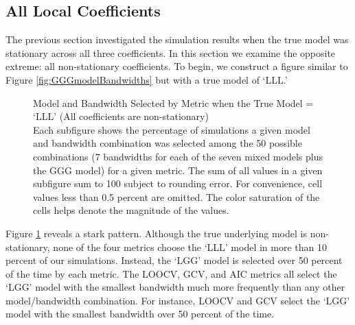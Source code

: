 \documentclass{article}\usepackage[]{graphicx}\usepackage[]{color}
\begin{document}
\subsection{All Local Coefficients}

The previous section investigated the simulation results when the true model was stationary across all three coefficients. In this section we examine the opposite extreme: all non-stationary coefficients. To begin, we construct a figure similar to Figure \ref{fig:GGGmodelBandwidths} but with a true model of `LLL.'   



\begin{figure}
\caption{Model and Bandwidth Selected by Metric when the True Model = `LLL' (All coefficients are non-stationary) \\ Each subfigure shows the percentage of simulations a given model and bandwidth combination was selected among the 50 possible combinations (7 bandwidths for each of the seven mixed models plus the GGG model) for a given metric. The sum of all values in a given subfigure sum to 100 subject to rounding error. For convenience, cell values less than 0.5 percent are omitted. The color saturation of the cells helps denote the magnitude of the values.}
\label{fig:LLLmodelBandwidths}
\end{figure}

Figure \ref{fig:LLLmodelBandwidths} reveals a stark pattern. Although the true underlying model is non-stationary, none of the four metrics choose the `LLL' model in more than 10 percent of our simulations. Instead, the `LGG' model is selected over 50 percent of the time by each metric. The LOOCV, GCV, and AIC metrics all select the `LGG' model with the smallest bandwidth much more frequently than any other model/bandwidth combination. For instance, LOOCV and GCV select the `LGG' model with the smallest bandwidth over 50 percent of the time. 
\end{document}
